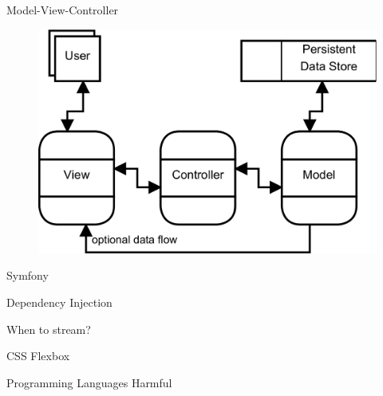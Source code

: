 




Model-View-Controller \citep[Seite 176f]{voorhees2020guide}

\begin{figure}[H]
    \centering
    \includegraphics[width=.7\linewidth]{../img/mvc.png}
    \caption{\citep[Seite 177]{voorhees2020guide}}
\end{figure}

Symfony \citep{potencier2022symfony}

Dependency Injection \citep{seemann2019dependency}

When to stream? \citep{braaksma2014streaming}

CSS Flexbox \citep{flexbox-csstricks}

Programming Languages Harmful \citep{janssenscan}





